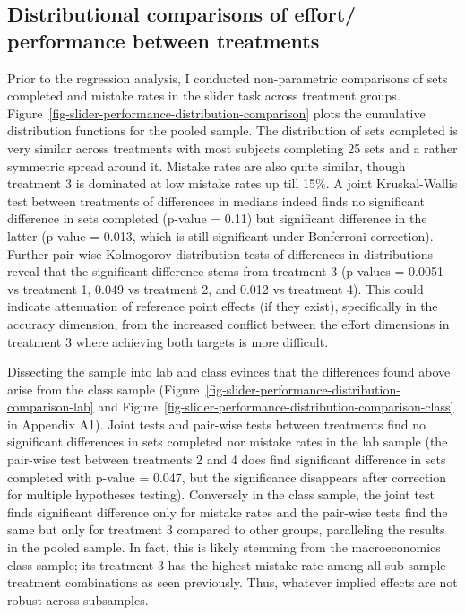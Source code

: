 \documentclass[12pt, letterpaper, DIV=11, numbers=noendperiod]{article}
\begin{document}
\subsection{Distributional comparisons of effort/ performance between treatments}\label{distributional-comparisons-of-effort-performance-between-treatments}

Prior to the regression analysis, I conducted non-parametric comparisons of sets completed and mistake rates in the slider task across treatment groups. Figure~\ref{fig-slider-performance-distribution-comparison} plots the cumulative distribution functions for the pooled sample. The distribution of sets completed is very similar across treatments with most subjects completing 25 sets and a rather symmetric spread around it. Mistake rates are also quite similar, though treatment 3 is dominated at low mistake rates up till 15\%. A joint Kruskal-Wallis test between treatments of differences in medians indeed finds no significant difference in sets completed (p-value = 0.11) but significant difference in the latter (p-value = 0.013, which is still significant under Bonferroni correction). Further pair-wise Kolmogorov distribution tests of differences in distributions reveal that the significant difference stems from treatment 3 (p-values = 0.0051 vs treatment 1, 0.049 vs treatment 2, and 0.012 vs treatment 4). This could indicate attenuation of reference point effects (if they exist), specifically in the accuracy dimension, from the increased conflict between the effort dimensions in treatment 3 where achieving both targets is more difficult.

Dissecting the sample into lab and class evinces that the differences found above arise from the class sample (Figure~\ref{fig-slider-performance-distribution-comparison-lab} and Figure~\ref{fig-slider-performance-distribution-comparison-class} in Appendix A1). Joint tests and pair-wise tests between treatments find no significant differences in sets completed nor mistake rates in the lab sample (the pair-wise test between treatments 2 and 4 does find significant difference in sets completed with p-value = 0.047, but the significance disappears after correction for multiple hypotheses testing). Conversely in the class sample, the joint test finds significant difference only for mistake rates and the pair-wise tests find the same but only for treatment 3 compared to other groups, paralleling the results in the pooled sample. In fact, this is likely stemming from the macroeconomics class sample; its treatment 3 has the highest mistake rate among all sub-sample-treatment combinations as seen previously. Thus, whatever implied effects are not robust across subsamples.
\end{document}
